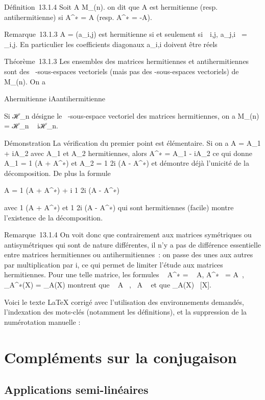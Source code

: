 Définition~13.1.4 Soit A \in M_(n). on dit que A est hermitienne
(resp. antihermitienne) si A^∗ = A (resp. A^∗ =
-A).

Remarque~13.1.3 A = (a_i,j) est hermitienne si et seulement
si~\forall~i,j, a_j,i~ =
\overlinea_i,j. En particulier les
coefficients diagonaux a_i,i doivent être réels

Théorème~13.1.3 Les ensembles des matrices hermitiennes et
antihermitiennes sont des ~-sous-espaces vectoriels (mais pas des
-sous-espaces vectoriels) de M_(n). On a

A\text hermitienne  \Leftrightarrow
iA\text antihermitienne

Si ℋ_n désigne le ~-sous-espace vectoriel des matrices
hermitiennes, on a M_(n) = ℋ_n \oplus~ iℋ_n.

Démonstration La vérification du premier point est élémentaire. Si on a
A = A_1 + iA_2 avec A_1 et A_2
hermitiennes, alors A^∗ = A_1 - iA_2 ce qui
donne A_1 = 1  (A + A^∗)
et A_2 = 1 \over 2i (A - A^∗) et
démontre déjà l'unicité de la décomposition. De plus la formule

A = 1  (A + A^∗) + i 1
\over 2i (A - A^∗)

avec  1  (A + A^∗) et  1
\over 2i (A - A^∗) qui sont hermitiennes
(facile) montre l'existence de la décomposition.

Remarque~13.1.4 On voit donc que contrairement aux matrices symétriques
ou antisymétriques qui sont de nature différentes, il n'y a pas de
différence essentielle entre matrices hermitiennes ou antihermitiennes~:
on passe des unes aux autres par multiplication par i, ce qui permet de
limiter l'étude aux matrices hermitiennes. Pour une telle matrice, les
formules ~
A^∗ =
\overline{}~
A,
A^∗~ =
\overline{}A~,
\chi_A^∗(X) =
\overline\chi_A(X) montrent que
~ A \in {}~,
~A \in {}~ et que
\chi_A(X) \in {}~[X].

Voici le texte LaTeX corrigé avec l'utilisation des environnements demandés, l'indexation des mots-clés (notamment les définitions), et la suppression de la numérotation manuelle :

\section{Compléments sur la conjugaison}

\subsection{Applications semi-linéaires}

